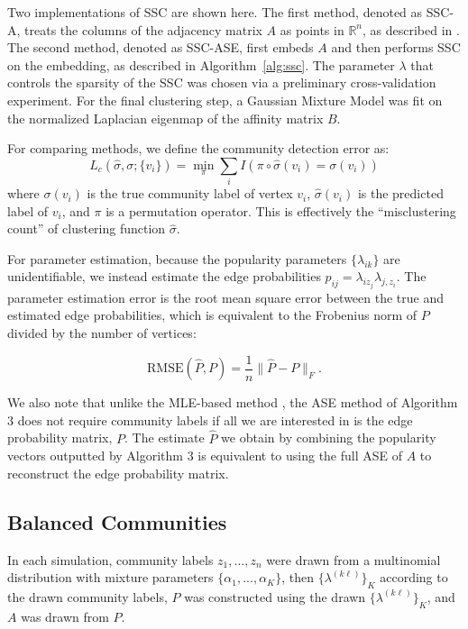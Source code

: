 \documentclass[12pt]{article}
\begin{document}
Two implementations of SSC are shown here. The first method, denoted as
SSC-A, treats the columns of the adjacency matrix \(A\) as points in
\(\mathbb{R}^n\), as described in \citet{noroozi2019estimation}.
The second method, denoted as SSC-ASE, first embeds \(A\) and then
performs SSC on the embedding, as described in Algorithm~\ref{alg:ssc}. The 
parameter \(\lambda\) that controls the sparsity of the SSC was chosen via a preliminary cross-validation
experiment. For the final clustering step, a Gaussian Mixture Model was
fit on the normalized Laplacian eigenmap of the affinity matrix \(B\).

For comparing methods, we define the community detection error as:
\[L_c(\hat{\sigma}, \sigma; \{v_i\}) =
\min_\pi \sum_i I(\pi \circ \hat{\sigma}(v_i) = \sigma(v_i))\]
where \(\sigma(v_i)\) is the true community label of vertex \(v_i\),
\(\hat{\sigma}(v_i)\) is the predicted label of \(v_i\), and \(\pi\) is
a permutation operator. This is effectively the ``misclustering count''
of clustering function \(\hat{\sigma}\).

For parameter estimation, because the popularity parameters $\{\lambda_{ik}\}$ are unidentifiable, we instead estimate the edge probabilities $p_{ij} = \lambda_{i z_j} \lambda_{j, z_i}$. The parameter estimation error is the root mean square error between the true and estimated edge probabilities, which is equivalent to the Frobenius norm of $P$ divided by the number of vertices:

$$\mathrm{RMSE}(\hat{P}, P) = \frac{1}{n} \|\hat{P} - P\|_F.$$

We also note that unlike the MLE-based method \citep{307cbeb9b1be48299388437423d94bf1}, the ASE method of Algorithm 3 does not require community labels if all we are interested in is the edge probability matrix, $P$. The estimate $\hat{P}$ we obtain by combining the popularity vectors outputted by Algorithm 3 is equivalent to using the full ASE of $A$ to reconstruct the edge probability matrix. 

\hypertarget{balanced-communities}{%
\subsection{Balanced Communities}\label{balanced-communities}}

In each simulation, community labels \(z_1, ..., z_n\) were drawn from a
multinomial distribution with mixture parameters
\(\{\alpha_1, ..., \alpha_K\}\), then \(\{\lambda^{(k \ell)}\}_K\) according
to the drawn community labels, \(P\) was constructed using the drawn
\(\{\lambda^{(k \ell)}\}_K\), and \(A\) was drawn from \(P\).
\end{document}
